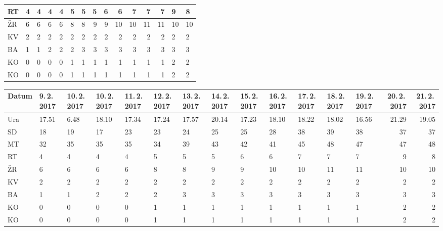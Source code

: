 \documentclass[12pt, a4paper, oneside]{report}
\begin{document}
\begin{table}
\begin{tabular}{|HHHHHHHr|r|r|r|r|rHH|}
    RT & 4 & 4 & 4 & 4 & 5 & 5 & 5 & 6 & 6 & 7 & 7 & 7 & 9 & 8 \\ \hline
    ŽR & 6 & 6 & 6 & 6 & 8 & 8 & 9 & 9 & 10 & 10 & 11 & 11 & 10 & 10 \\ \hline
    KV & 2 & 2 & 2 & 2 & 2 & 2 & 2 & 2 & 2 & 2 & 2 & 2 & 2 & 2 \\ \hline
    BA & 1 & 1 & 2 & 2 & 2 & 3 & 3 & 3 & 3 & 3 & 3 & 3 & 3 & 3 \\ \hline
    KO & 0 & 0 & 0 & 0 & 1 & 1 & 1 & 1 & 1 & 1 & 1 & 1 & 2 & 2 \\ \hline
    KO & 0 & 0 & 0 & 0 & 1 & 1 & 1 & 1 & 1 & 1 & 1 & 1 & 2 & 2 \\ \hline \hline
  \end{tabular}
  \vspace{0.3cm}
  \begin{tabular}{|HHHHHHHHHHHHHr|r||}
    \hline \hline
    Datum & 9.\,2.\,2017 & 10.\,2.\,2017 & 10.\,2.\,2017 & 11.\,2.\,2017 & 12.\,2.\,2017 & 13.\,2.\,2017 & 14.\,2.\,2017 & 15.\,2.\,2017 & 16.\,2.\,2017 & 17.\,2.\,2017 & 18.\,2.\,2017 & 19.\,2.\,2017 & 20.\,2.\,2017 & 21.\,2.\,2017 \\ \hline
    Ura & 17.51	& 6.48	& 18.10	& 17.34	& 17.24	& 17.57	& 20.14	& 17.23	& 18.10	& 18.22	& 18.02	& 16.56	& 21.29	& 19.05 \\ \hline \hline
    SD & 18 & 19 & 17 & 23 & 23 & 24 & 25 & 25 & 28 & 38 & 39 & 38 & 37 & 37 \\ \hline
    MT & 32 & 35 & 35 & 35 & 34 & 39 & 43 & 42 & 41 & 45 & 48 & 47 & 47 & 48 \\ \hline
    RT & 4 & 4 & 4 & 4 & 5 & 5 & 5 & 6 & 6 & 7 & 7 & 7 & 9 & 8 \\ \hline
    ŽR & 6 & 6 & 6 & 6 & 8 & 8 & 9 & 9 & 10 & 10 & 11 & 11 & 10 & 10 \\ \hline
    KV & 2 & 2 & 2 & 2 & 2 & 2 & 2 & 2 & 2 & 2 & 2 & 2 & 2 & 2 \\ \hline
    BA & 1 & 1 & 2 & 2 & 2 & 3 & 3 & 3 & 3 & 3 & 3 & 3 & 3 & 3 \\ \hline
    KO & 0 & 0 & 0 & 0 & 1 & 1 & 1 & 1 & 1 & 1 & 1 & 1 & 2 & 2 \\ \hline
    KO & 0 & 0 & 0 & 0 & 1 & 1 & 1 & 1 & 1 & 1 & 1 & 1 & 2 & 2 \\ \hline \hline
  \end{tabular}
\end{table}
\end{document}
